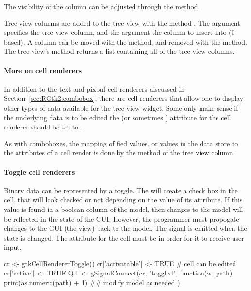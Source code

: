 The visibility of the column can be adjusted through the
 method. 


Tree view columns are added to the tree view with the
method . The
 argument specifies the tree
view column, and the 
argument the column to insert into ($0$-based). A column can be moved
with the  method, and removed
with the  method. The tree view's
 method returns a list containing all
of the tree view columns.

\paragraph{More on cell renderers}

In addition to the text and pixbuf cell renderers discussed in
Section~\ref{sec:RGtk2:combobox}, there are cell renderers that allow
one to display other types of data available for the tree view widget.
Some only make sense if the underlying data is to be edited the
 (or sometimes ) attribute for the
cell renderer should be set to .


As with comboboxes, the mapping of fied values, or values in the data
store to the attributes of a cell render is done by the
 method of the tree view column.


\paragraph{Toggle cell renderers}
Binary data can be represented by a toggle. The
 will create a check box in the
cell, that  will look checked or not depending on the value of its
 attribute. If this value is found in a boolean column of
the model, then changes to the model will be reflected in the state of
the GUI. However, the programmer must propogate changes to the GUI (the
view) back to the model. The  signal is emitted when
the state is changed. The  attribute for the cell
must be  in order for it to receive user input.

\begin{Schunk}
\begin{Sinput}
 cr <- gtkCellRendererToggle()
 cr['activatable'] <- TRUE               # cell can be edited
 cr['active'] <- TRUE
 QT <- gSignalConnect(cr, "toggled", function(w, path) {
   print(as.numeric(path) + 1) ## modify model as needed
 })
\end{Sinput}
\end{Schunk}

